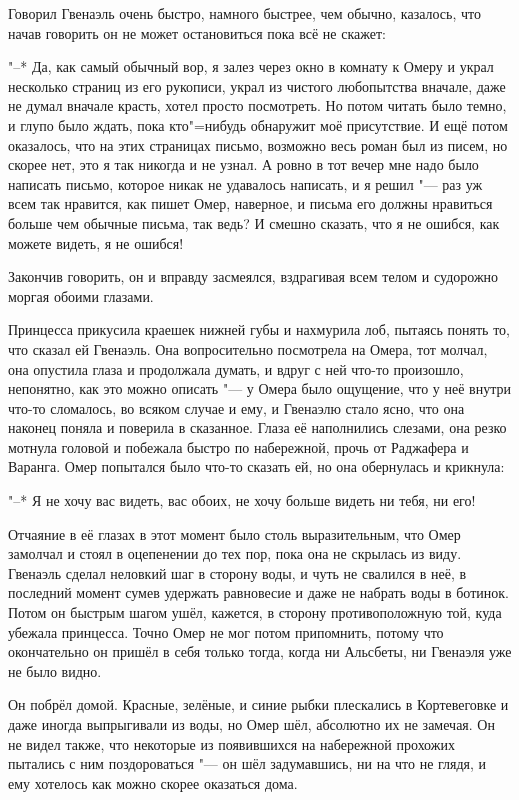Говорил Гвенаэль очень быстро, намного быстрее, чем обычно, казалось, что начав
говорить он не может остановиться пока всё не скажет:

"--* Да, как самый обычный вор, я залез через окно в комнату к Омеру и украл
несколько страниц из его рукописи, украл из чистого любопытства вначале, даже не
думал вначале красть, хотел просто посмотреть.
Но потом читать было темно, и глупо было ждать, пока кто"=нибудь обнаружит
моё присутствие.
И ещё потом оказалось, что на этих страницах письмо, возможно весь роман был из
писем, но скорее нет, это я так никогда и не узнал.
А ровно в тот вечер мне надо было написать письмо, которое никак не удавалось
написать, и я решил "--- раз уж всем так нравится, как пишет Омер, наверное, и
письма его должны нравиться больше чем обычные письма, так ведь?
И смешно сказать, что я не ошибся, как можете видеть, я не ошибся!

Закончив говорить, он и вправду засмеялся, вздрагивая всем телом и судорожно
моргая обоими глазами.

Принцесса прикусила краешек нижней губы и нахмурила лоб, пытаясь понять то, что
сказал ей Гвенаэль.
Она вопросительно посмотрела на Омера, тот молчал, она опустила глаза и
продолжала думать, и вдруг с ней что-то произошло, непонятно, как это можно
описать "--- у Омера было ощущение, что у неё внутри что-то сломалось, во всяком
случае и ему, и Гвенаэлю стало ясно, что она наконец поняла и поверила в
сказанное.
Глаза её наполнились слезами, она резко мотнула головой и побежала быстро по
набережной, прочь от Раджафера и Варанга.
Омер попытался было что-то сказать ей, но она обернулась и крикнула:

"--* Я не хочу вас видеть, вас обоих, не хочу больше видеть ни тебя, ни его!

Отчаяние в её глазах в этот момент было столь выразительным, что Омер замолчал и
стоял в оцепенении до тех пор, пока она не скрылась из виду.
Гвенаэль сделал неловкий шаг в сторону воды, и чуть не свалился в неё, в
последний момент сумев удержать равновесие и даже не набрать воды в ботинок.
Потом он быстрым шагом ушёл, кажется, в сторону противоположную той, куда
убежала принцесса.
Точно Омер не мог потом припомнить, потому что окончательно он пришёл в себя
только тогда, когда ни Альсбеты, ни Гвенаэля уже не было видно.

Он побрёл домой.
Красные, зелёные, и синие рыбки плескались в Кортевеговке и даже иногда
выпрыгивали из воды, но Омер шёл, абсолютно их не замечая.
Он не видел также, что некоторые из появившихся на набережной прохожих пытались
с ним поздороваться "--- он шёл задумавшись, ни на что не глядя, и ему хотелось
как можно скорее оказаться дома.
